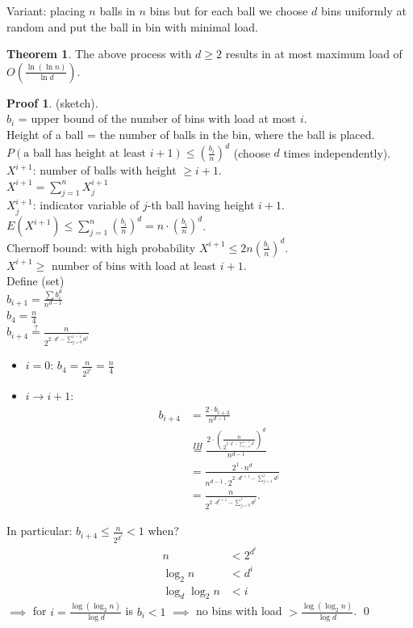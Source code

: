 \documentclass[a4paper, 12pt]{book}
\theoremstyle{definition}
\newtheorem{theorem}[counter]{Theorem}
\newtheorem{pro}[counter]{Proof}
\theoremstyle{remark}
\begin{document}
Variant: placing $n$ balls in $n$ bins but for each ball we choose $d$ bins uniformly at random and
put the ball in bin with minimal load.
\begin{theorem}
  The above process with $d \geq 2$ results in at most maximum load of $O\left(\frac{\ln (\ln n)}{\ln d}\right)$.
\end{theorem}
\begin{pro}(sketch). \\
  $b_i$ = upper bound of the number of bins with load at most $i$. \\
  Height of a ball = the number of balls in the bin, where the ball is placed. \\
  $P(\text{a ball has height at least } i+1) \leq \left(\frac{b_i}{n}\right)^d$ (choose $d$ times independently). \\
  $X^{i+1}$: number of balls with height $ \geq i+1$. \\
  $X^{i+1} = \sum_{j=1}^{n} X_j^{i+1}$ \\
  $X_j^{i+1}$: indicator variable of $j$-th ball having height $i+1$. \\
  $E(X^{i+1}) \leq \sum_{j=1}^{n} \left(\frac{b_i}{n}\right)^d = n \cdot \left(\frac{b_i}{n}\right)^d$. \\
  Chernoff bound: with high probability $X^{i+1} \leq 2 n \left(\frac{b_i}{n}\right)^d$. \\
  $X^{i+1} \geq$ number of bins with load at least $i+1$. \\
  Define (set) \\
  $b_{i+1} = \frac{\sum b_i^d}{n^{d-1}}$ \\
  $b_4 = \frac{n}{4}$ \\
  $b_{i+4} \stackrel{?}{=} \frac{n}{2^{2 \cdot d^i - \sum_{j=0}^{i-1} d^j}}$
  \begin{itemize}[label={}]
    \item $i=0$: $b_4 = \frac{n}{2^{2^1}} = \frac{n}{4}$
    \item $i \to i+1$:
      \begin{align*}
        b_{i+4} &= \frac{2 \cdot b_{i+3}}{n^{d-1}} \\
        &\stackrel{IH}{=} \frac{2 \cdot \left(\frac{n}{2^{2 \cdot d^i - \sum_{j=0}^{i-1} d^j}}\right)^d}{n^{d-1}} \\
        &= \frac{2^1 \cdot n^d}{n^{d-1} \cdot 2^{2 \cdot d^{i+1} - \sum_{j=1}^{i} d^j}} \\
        &= \frac{n}{2^{2 \cdot d^{i+1} - \sum_{j=0}^{i} d^j}}.
      \end{align*}
  \end{itemize}
  In particular: $b_{i+4} \leq \frac{n}{2^{d^i}} < 1$ when?
  \begin{align*}
    n &< 2^{d^i} \\
    \log_2 n &< d^i \\
    \log_d \log_2 n &< i
  \end{align*}
  $\implies$ for $i = \frac{\log (\log_2 n)}{\log d}$ is $b_i < 1$ $\implies$ no bins with load
  $> \frac{\log (\log_2 n)}{\log d}$.
  \qed
\end{pro}
\end{document}

